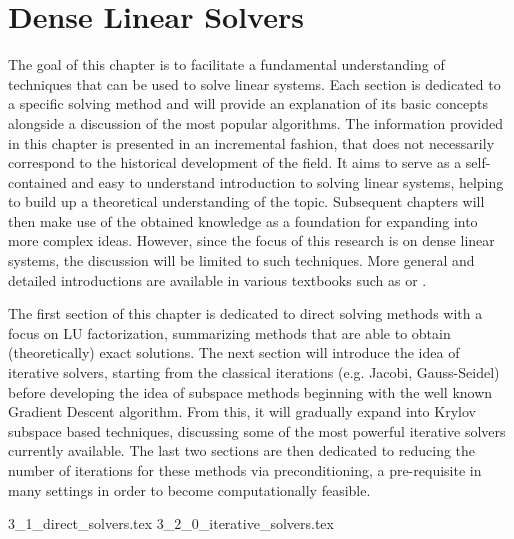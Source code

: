 \chapter{Dense Linear Solvers}
\label{chap:solvers}

The goal of this chapter is to facilitate a fundamental understanding of techniques that can be used to solve linear systems. Each section is dedicated to a specific solving method and will provide an explanation of its basic concepts alongside a discussion of the most popular algorithms. The information provided in this chapter is presented in an incremental fashion, that does not necessarily correspond to the historical development of the field. It aims to serve as a self-contained and easy to understand introduction to solving linear systems, helping to build up a theoretical understanding of the topic. Subsequent chapters will then make use of the obtained knowledge as a foundation for expanding into more complex ideas. However, since the focus of this research is on dense linear systems, the discussion will be limited to such techniques. More general and detailed introductions are available in various textbooks such as \cite{saad_iterative_2003} or \cite{golub_matrix_2013}.

The first section of this chapter is dedicated to direct solving methods with a focus on LU factorization, summarizing methods that are able to obtain (theoretically) exact solutions. The next section will introduce the idea of iterative solvers, starting from the classical iterations (e.g. Jacobi, Gauss-Seidel) before developing the idea of subspace methods beginning with the well known Gradient Descent algorithm. From this, it will gradually expand into Krylov subspace based techniques, discussing some of the most powerful iterative solvers currently available. The last two sections are then dedicated to reducing the number of iterations for these methods via preconditioning, a pre-requisite in many settings in order to become computationally feasible.


{3_1_direct_solvers.tex}
{3_2_0_iterative_solvers.tex}
